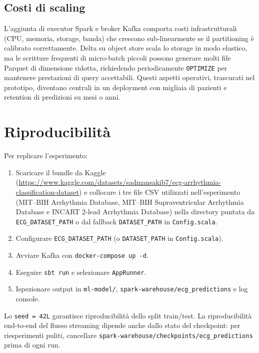 \subsection{Costi di scaling}

L'aggiunta di executor Spark e broker Kafka comporta costi infrastrutturali (CPU, memoria, storage, banda) che crescono sub-linearmente se il partitioning è calibrato correttamente.
Delta su object store scala lo storage in modo elastico, ma le scritture frequenti di micro-batch piccoli possono generare molti file Parquet di dimensione ridotta, richiedendo periodicamente \texttt{OPTIMIZE} per mantenere prestazioni di query accettabili.
Questi aspetti operativi, trascurati nel prototipo, diventano centrali in un deployment con migliaia di pazienti e retention di predizioni su mesi o anni.

\section{Riproducibilità}\label{sec:riproducibilita}

Per replicare l'esperimento:

\begin{enumerate}
  \item Scaricare il bundle da Kaggle~\cite{sakib2021kaggle} (\url{https://www.kaggle.com/datasets/sadmansakib7/ecg-arrhythmia-classification-dataset}) e collocare i tre file CSV utilizzati nell'esperimento (MIT--BIH Arrhythmia Database, MIT--BIH Supraventricular Arrhythmia Database e INCART 2-lead Arrhythmia Database) nella directory puntata da \texttt{ECG\_DATASET\_PATH} o dal fallback \texttt{DATASET\_PATH} in \texttt{Config.scala}.
  \item Configurare \texttt{ECG\_DATASET\_PATH} (o \texttt{DATASET\_PATH} in \texttt{Config.scala}).
  \item Avviare Kafka con \texttt{docker-compose up -d}.
  \item Eseguire \texttt{sbt run} e selezionare \texttt{AppRunner}.
  \item Ispezionare output in \texttt{ml-model/}, \texttt{spark-warehouse/ecg\_predictions} e log console.
\end{enumerate}

Lo \texttt{seed = 42L} garantisce riproducibilità dello split train/test.
La riproducibilità end-to-end del flusso streaming dipende anche dallo stato del checkpoint: per riesperimenti puliti, cancellare \texttt{spark-warehouse/checkpoints/ecg\_predictions} prima di ogni run.

